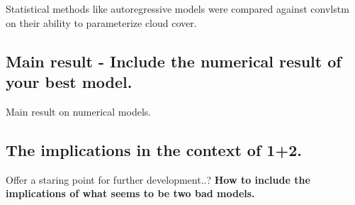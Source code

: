 Statistical methods like autoregressive models were compared against \acrfull{convlstm} on their ability to parameterize cloud cover.

\subsection*{Main result - Include the numerical result of your best model.}

Main result on numerical models.

\subsection*{The implications in the context of 1+2.}
Offer a staring point for further development..? \textbf{How to include the implications of what seems to be two bad models.}

\cleardoublepage